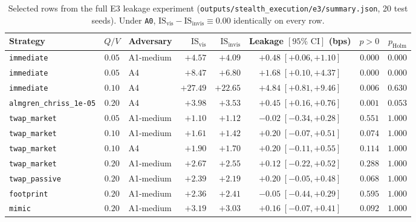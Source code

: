 \documentclass[11pt,a4paper]{article}
\newcommand{\code}[1]{\texttt{#1}}
\begin{document}
\begin{table}[h!]
\centering\small\setlength{\tabcolsep}{3.5pt}
\begin{tabular}{L{3.1cm} c l r r c r r}
\toprule
Strategy & $Q/V$ & Adversary & $\text{IS}_{\text{vis}}$ & $\text{IS}_{\text{invis}}$ & Leakage $[95\%\text{ CI}]$ (bps) & $p > 0$ & $p_{\text{Holm}}$ \\
\midrule
\code{immediate} & $0.05$ & A1-medium & $+4.57$ & $+4.09$ & $+0.48\;[+0.06, +1.10]$ & $\mathbf{0.000}$ & $\mathbf{0.000}$ \\
\code{immediate} & $0.05$ & A4        & $+8.47$ & $+6.80$ & $+1.68\;[+0.10, +4.37]$ & $\mathbf{0.000}$ & $\mathbf{0.000}$ \\
\code{immediate} & $0.10$ & A4        & $+27.49$ & $+22.65$ & $+4.84\;[+0.81, +9.46]$ & $\mathbf{0.006}$ & $0.630$ \\
\code{almgren\_chriss\_1e-05} & $0.20$ & A4 & $+3.98$ & $+3.53$ & $+0.45\;[+0.16, +0.76]$ & $\mathbf{0.001}$ & $0.053$ \\
\code{twap\_market} & $0.05$ & A1-medium & $+1.10$ & $+1.12$ & $-0.02\;[-0.34, +0.28]$ & $0.551$ & $1.000$ \\
\code{twap\_market} & $0.10$ & A1-medium & $+1.61$ & $+1.42$ & $+0.20\;[-0.07, +0.51]$ & $0.074$ & $1.000$ \\
\code{twap\_market} & $0.10$ & A4        & $+1.90$ & $+1.70$ & $+0.20\;[-0.11, +0.55]$ & $0.114$ & $1.000$ \\
\code{twap\_market} & $0.20$ & A1-medium & $+2.67$ & $+2.55$ & $+0.12\;[-0.22, +0.52]$ & $0.288$ & $1.000$ \\
\code{twap\_passive} & $0.20$ & A1-medium & $+2.39$ & $+2.19$ & $+0.20\;[-0.05, +0.48]$ & $0.068$ & $1.000$ \\
\code{footprint} & $0.20$ & A1-medium & $+2.36$ & $+2.41$ & $-0.05\;[-0.44, +0.29]$ & $0.595$ & $1.000$ \\
\code{mimic} & $0.20$ & A1-medium & $+3.19$ & $+3.03$ & $+0.16\;[-0.07, +0.41]$ & $0.092$ & $1.000$ \\
\bottomrule
\end{tabular}
\caption{Selected rows from the full E3 leakage experiment (\code{outputs/stealth\_execution/e3/summary.json}, 20 test seeds).
Under \code{A0}, $\text{IS}_{\text{vis}} - \text{IS}_{\text{invis}} \equiv 0.00$ identically on every row.}
\label{tab:e3_results}
\end{table}
\end{document}
